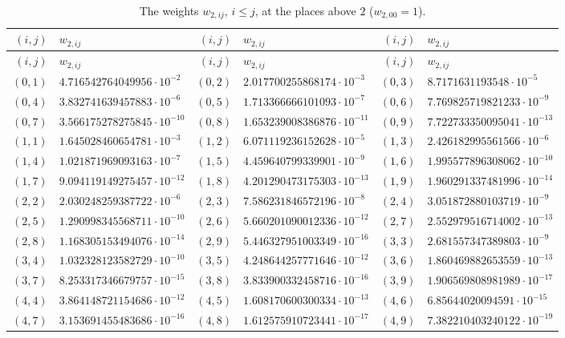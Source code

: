 {\footnotesize
\begin{longtable}{rlrlrl}
\caption{The weights $w_{2,ij}$, $i\le j$, at the places above $2$ ($w_{2,00}=1$).}\label{fw-data:2}\\
\toprule
$(i,j)$ & $w_{2,ij}$ & $(i,j)$ & $w_{2,ij}$ & $(i,j)$ & $w_{2,ij}$\\
\midrule
\endfirsthead
\toprule
$(i,j)$ & $w_{2,ij}$ & $(i,j)$ & $w_{2,ij}$ & $(i,j)$ & $w_{2,ij}$\\
\midrule
\endhead
$(0,1)$ & $4.716542764049956\cdot10^{-2}$ & $(0,2)$ & $2.017700255868174\cdot10^{-3}$ & $(0,3)$ & $8.7171631193548\cdot10^{-5}$\\
$(0,4)$ & $3.832741639457883\cdot10^{-6}$ & $(0,5)$ & $1.713366666101093\cdot10^{-7}$ & $(0,6)$ & $7.769825719821233\cdot10^{-9}$\\
$(0,7)$ & $3.566175278275845\cdot10^{-10}$ & $(0,8)$ & $1.653239008386876\cdot10^{-11}$ & $(0,9)$ & $7.722733350095041\cdot10^{-13}$\\
$(1,1)$ & $1.645028460654781\cdot10^{-3}$ & $(1,2)$ & $6.071119236152628\cdot10^{-5}$ & $(1,3)$ & $2.426182995561566\cdot10^{-6}$\\
$(1,4)$ & $1.021871969093163\cdot10^{-7}$ & $(1,5)$ & $4.459640799339901\cdot10^{-9}$ & $(1,6)$ & $1.995577896308062\cdot10^{-10}$\\
$(1,7)$ & $9.094119149275457\cdot10^{-12}$ & $(1,8)$ & $4.201290473175303\cdot10^{-13}$ & $(1,9)$ & $1.960291337481996\cdot10^{-14}$\\
$(2,2)$ & $2.030248259387722\cdot10^{-6}$ & $(2,3)$ & $7.586231846572196\cdot10^{-8}$ & $(2,4)$ & $3.051872880103719\cdot10^{-9}$\\
$(2,5)$ & $1.290998345568711\cdot10^{-10}$ & $(2,6)$ & $5.660201090012336\cdot10^{-12}$ & $(2,7)$ & $2.552979516714002\cdot10^{-13}$\\
$(2,8)$ & $1.168305153494076\cdot10^{-14}$ & $(2,9)$ & $5.446327951003349\cdot10^{-16}$ & $(3,3)$ & $2.681557347389803\cdot10^{-9}$\\
$(3,4)$ & $1.032328123582729\cdot10^{-10}$ & $(3,5)$ & $4.248644257771646\cdot10^{-12}$ & $(3,6)$ & $1.860469882653559\cdot10^{-13}$\\
$(3,7)$ & $8.253317346679757\cdot10^{-15}$ & $(3,8)$ & $3.833900332458716\cdot10^{-16}$ & $(3,9)$ & $1.906569808981989\cdot10^{-17}$\\
$(4,4)$ & $3.864148721154686\cdot10^{-12}$ & $(4,5)$ & $1.608170600300334\cdot10^{-13}$ & $(4,6)$ & $6.85644020094591\cdot10^{-15}$\\
$(4,7)$ & $3.153691455483686\cdot10^{-16}$ & $(4,8)$ & $1.612575910723441\cdot10^{-17}$ & $(4,9)$ & $7.382210403240122\cdot10^{-19}$\\

\end{longtable}}
